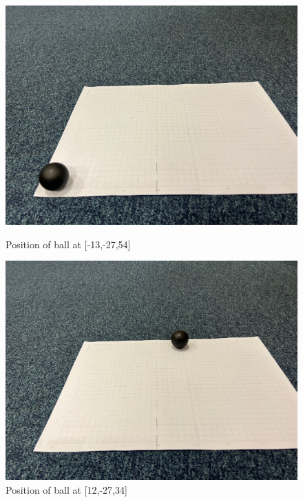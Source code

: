\documentclass{article}
\begin{document}
\begin{figure}[h!]
\begin{minipage}[b]{0.5\linewidth}
    \centering
    \includegraphics[width=.2\textheight]{3.jpg} 
    \caption{\label{fig:33}Position of ball at [-13,-27,54]} 
    \vspace{4ex}
  \end{minipage}%
  \begin{minipage}[b]{0.5\linewidth}
    \centering
    \includegraphics[width=.2\textheight]{4.jpg} 
    \caption{\label{fig:44}Position of ball at [12,-27,34]} 
    \vspace{4ex}
  \end{minipage} 
\end{figure}
\end{document}
